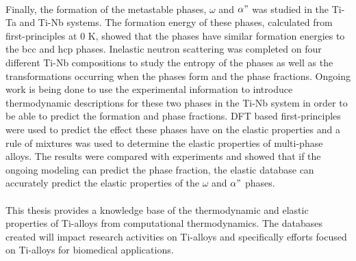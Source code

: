 \paragraph*{} Finally, the formation of the metastable phases, $\omega$ and $\alpha"$ was studied in the Ti-Ta and Ti-Nb systems. The formation energy of these phases, calculated from first-principles at 0 K, showed that the phases have similar formation energies to the bcc and hcp phases. Inelastic neutron scattering was completed on four different Ti-Nb compositions to study the entropy of the phases as well as the transformations occurring when the phases form and the phase fractions. Ongoing work is being done to use the experimental information to introduce thermodynamic descriptions for these two phases in the Ti-Nb system in order to be able to predict the formation and phase fractions. DFT based first-principles were used to predict the effect these phases have on the elastic properties and a rule of mixtures was used to determine the elastic properties of multi-phase alloys. The results were compared with experiments and showed that if the ongoing modeling can predict the phase fraction, the elastic database can accurately predict the elastic properties of the $\omega$ and $\alpha"$ phases.
\paragraph*{} This thesis provides a knowledge base of the thermodynamic and elastic properties of Ti-alloys from computational thermodynamics. The databases created will impact research activities on Ti-alloys and specifically efforts focused on Ti-alloys for biomedical applications.